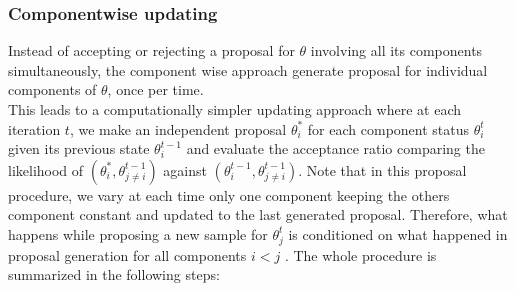 \subsubsection{Componentwise updating}
Instead of accepting or rejecting a proposal for $\theta$ involving all its components simultaneously, the component wise approach generate proposal for individual components of $\theta$, once per time.\\
This leads to a  computationally simpler updating approach where at each iteration $t$, we  make an independent proposal $\theta_i^*$ for each component status $\theta_i^t$ given its previous state  $\theta_i^{t-1}$ and evaluate the acceptance ratio comparing the likelihood of $(\theta_i^* , \theta_{j\neq i}^{t-1} )$ against $(\theta_i^{t-1} , \theta_{j\neq i}^{t-1} )$.
Note that in this proposal procedure, we  vary at each time only one component keeping the others component constant and updated to the last generated proposal.  Therefore, what happens while proposing a new sample for $\theta_{j}^{t}$ is conditioned on what
happened in proposal generation for all components $i<j$ .
The whole procedure is summarized in the following steps:\\

